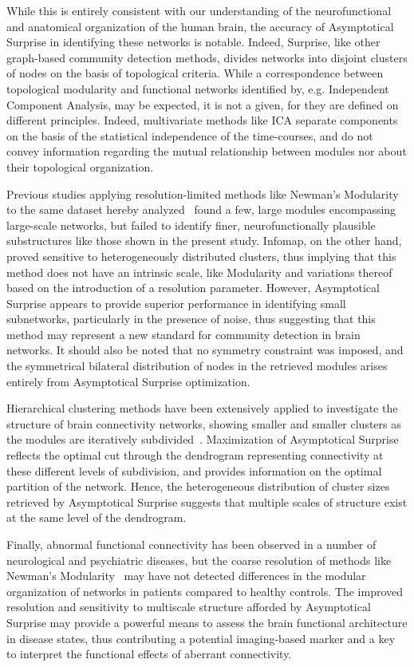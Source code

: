 While this is entirely consistent with our understanding of the neurofunctional and anatomical organization of the human brain, the accuracy of Asymptotical Surprise in identifying these networks is notable.
Indeed, Surprise, like other graph-based community detection methods, divides networks into disjoint clusters of nodes on the basis of topological criteria.
While a correspondence between topological modularity and functional networks identified by, e.g. Independent Component Analysis, may be expected, it is not a given, for they are defined on different principles. Indeed, multivariate methods like ICA separate components on the basis of the statistical independence of the time-courses, and do not convey information regarding the mutual relationship between modules nor about their topological organization.

Previous studies applying resolution-limited methods like Newman's Modularity to the same dataset hereby analyzed~\cite{crossley2013a} found a few, large modules encompassing large-scale networks, but failed to identify finer, neurofunctionally  plausible substructures like those shown in the present study. Infomap, on the other hand, proved sensitive to heterogeneously distributed clusters, thus implying that this method does not have an intrinsic scale, like Modularity and variations thereof based on the introduction of a resolution parameter. 
However, Asymptotical Surprise appears to provide superior performance in identifying small subnetworks, particularly in the presence of noise, thus suggesting that this method may represent a new standard for community detection in brain networks. It should also be noted that no symmetry constraint was imposed, and the symmetrical bilateral distribution of nodes in the retrieved modules arises entirely from Asymptotical Surprise optimization. 

Hierarchical clustering methods have been extensively applied to investigate the structure of brain connectivity networks, showing smaller and smaller clusters as the modules are iteratively subdivided~\cite{meunier2010}.  Maximization of Asymptotical Surprise reflects the optimal cut through the dendrogram representing connectivity at these different levels of subdivision, and provides information on the optimal partition of the network. Hence, the heterogeneous distribution of cluster sizes retrieved by Asymptotical Surprise suggests that multiple scales of structure exist at the same level of the dendrogram.

Finally, abnormal functional connectivity has been observed in a number of neurological and psychiatric diseases, but the coarse resolution of methods like Newman's Modularity~\cite{fornito2015} may have not detected differences in the modular organization of networks in patients compared to healthy controls. The improved resolution and sensitivity to multiscale structure afforded by Asymptotical Surprise may provide a powerful means to assess the brain functional architecture in disease states, thus contributing a potential imaging-based marker and a key to interpret the functional effects of aberrant connectivity.
